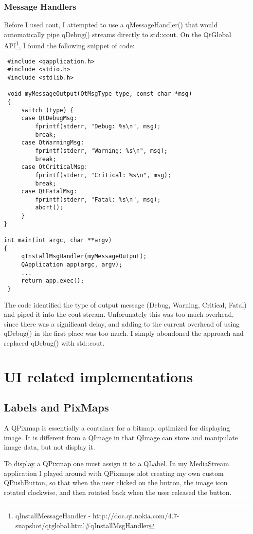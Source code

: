 \subsubsection{Message Handlers}
Before I used cout, I attempted to use a qMessageHandler() that would automatically pipe qDebug() streams directly to std::cout. On the QtGlobal API\footnote{qInstallMessageHandler - http://doc.qt.nokia.com/4.7-snapshot/qtglobal.html\#qInstallMsgHandler}\label{ref:qinst}, I found the following snippet of code:
\begin{lstlisting}
 #include <qapplication.h>
 #include <stdio.h>
 #include <stdlib.h>

 void myMessageOutput(QtMsgType type, const char *msg)
 {
     switch (type) {
     case QtDebugMsg:
         fprintf(stderr, "Debug: %s\n", msg);
         break;
     case QtWarningMsg:
         fprintf(stderr, "Warning: %s\n", msg);
         break;
     case QtCriticalMsg:
         fprintf(stderr, "Critical: %s\n", msg);
         break;
     case QtFatalMsg:
         fprintf(stderr, "Fatal: %s\n", msg);
         abort();
     }
}

int main(int argc, char **argv)
{
     qInstallMsgHandler(myMessageOutput);
     QApplication app(argc, argv);
     ...
     return app.exec();
 }
\end{lstlisting}
The code identified the type of output message (Debug, Warning, Critical, Fatal) and piped it into the cout stream. Unforunately this was too much overhead, since there was a significant delay, and adding to the current overhead of using qDebug() in the first place was  too much. I simply abondoned the approach and replaced qDebug() with std::cout.

\section{UI related implementations}\label{widgetstuff}

\subsection{Labels and PixMaps}
A QPixmap is essentially a container for a bitmap, optimized for displaying image. It is different from a QImage in that QImage can store and manipulate image data, but not display it.

To display a QPixmap one must assign it to a QLabel. In my MediaStream application I played around with QPixmaps alot creating my own custom QPushButton, so that when the user clicked on the button, the image icon rotated clockwise, and then rotated back when the user released the button.

